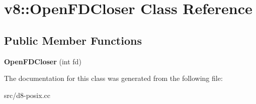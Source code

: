 \hypertarget{classv8_1_1_open_f_d_closer}{}\section{v8\+:\+:Open\+F\+D\+Closer Class Reference}
\label{classv8_1_1_open_f_d_closer}
\subsection*{Public Member Functions}
\begin{DoxyCompactItemize}
\item 
\hypertarget{classv8_1_1_open_f_d_closer_a06963560af61d526b81e31c4aae610a9}{}{\bfseries Open\+F\+D\+Closer} (int fd)\label{classv8_1_1_open_f_d_closer_a06963560af61d526b81e31c4aae610a9}

\end{DoxyCompactItemize}


The documentation for this class was generated from the following file\+:\begin{DoxyCompactItemize}
\item 
src/d8-\/posix.\+cc\end{DoxyCompactItemize}
